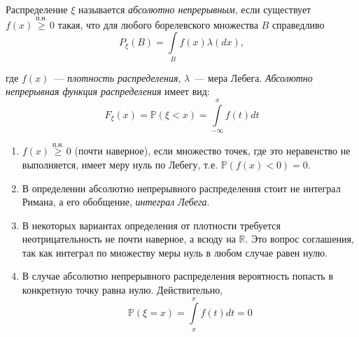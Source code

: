 \begin{defn}
    Распределение $\xi$ называется {\it абсолютно непрерывным}, если существует $f(x) \overset{\text{п.н.}}{\geqslant} 0$ такая, что для любого борелевского множества $B$ справедливо
    \begin{equation*}
        P_\xi(B) = \int\limits_B f(x) \lambda(dx),
    \end{equation*}
    
    где $f(x)$~--- {\it плотность распределения}, $\lambda$~--- мера Лебега. \textit{Абсолютно непрерывная функция распределения} имеет вид:
    \begin{equation*}
        F_\xi(x) = \mathbb{P}(\xi < x) = \int\limits_{-\infty}^x f(t)dt
    \end{equation*}
\end{defn}
\begin{rmrk}
\begin{enumerate}\leavevmode
    \item $f(x) \overset{\text{п.н.}}{\geqslant} 0$ (почти наверное), если множество точек, где это неравенство не выполняется, имеет меру нуль по Лебегу, т.е. $\mathbb{P}(f(x) < 0) = 0$.
    \item В определении абсолютно непрерывного распределения стоит не интеграл Римана, а его обобщение, \textit{интеграл Лебега}.
    \item В некоторых вариантах определения от плотности требуется неотрицательность не почти наверное, а всюду на $\mathbb{R}$. Это вопрос соглашения, так как интеграл по множеству меры нуль в любом случае равен нулю.
    \item В случае абсолютно непрерывного распределения вероятность попасть в конкретную точку равна нулю. Действительно,
    \begin{equation*}
        \mathbb{P}(\xi = x) = \int\limits_{x}^{x} f(t)dt = 0
    \end{equation*}
\end{enumerate}
\end{rmrk}

